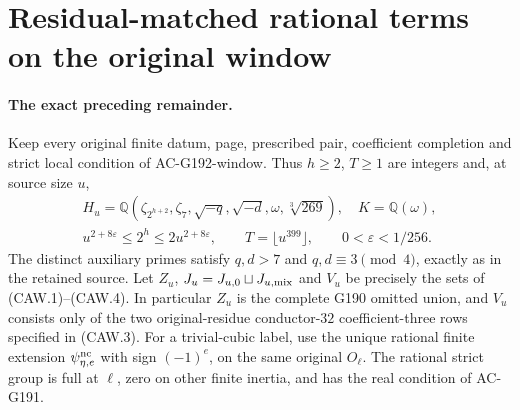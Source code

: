 \section{Residual-matched rational terms on the original window}
\label{sec:rational-one-prime-actual-window}

\paragraph{The exact preceding remainder.}
Keep every original finite datum, page, prescribed pair, coefficient
completion and strict local condition of AC-G192-window.
Thus $h\geq2$, $T\geq1$ are integers and, at source size $u$,
\[
 \begin{gathered}
 H_u=\mathbb Q(\zeta_{2^{h+2}},\zeta_7,\sqrt{-q},\sqrt{-d},
                         \omega,\sqrt[3]{269}),\quad K=\mathbb Q(\omega),\\
 u^{2+8\varepsilon}\leq2^h\leq2u^{2+8\varepsilon},\qquad
 T=\lfloor u^{399}\rfloor,\qquad0<\varepsilon<1/256.
 \end{gathered}\tag{RMW.1}
\]
The distinct auxiliary primes satisfy $q,d>7$ and
$q,d\equiv3\pmod4$, exactly as in the retained source.
Let $Z_u$, $J_u=J_{u,0}\sqcup J_{u,\rm mix}$ and $V_u$
be precisely the sets of (CAW.1)--(CAW.4).
In particular $Z_u$ is the complete G190 omitted union, and
$V_u$ consists only of the two original-residue conductor-$32$
coefficient-three rows specified in (CAW.3).
For a trivial-cubic label, use the unique rational finite extension
$\psi_{\eta,e}^{\rm nc}$ with sign $(-1)^e$, on the same original
$O_\ell$. The rational strict group is full at $\ell$, zero on
other finite inertia, and has the real condition of AC-G191.

